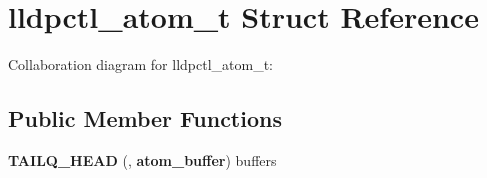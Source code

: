 \section{lldpctl\-\_\-atom\-\_\-t \-Struct \-Reference}
\label{structlldpctl__atom__t}


\-Collaboration diagram for lldpctl\-\_\-atom\-\_\-t\-:
\subsection*{\-Public \-Member \-Functions}
\begin{DoxyCompactItemize}
\item 
{\bfseries \-T\-A\-I\-L\-Q\-\_\-\-H\-E\-A\-D} (, {\bf atom\-\_\-buffer}) buffers\label{structlldpctl__atom__t_a8995b994a17003b177880b0a308d725a}

\end{DoxyCompactItemize}

